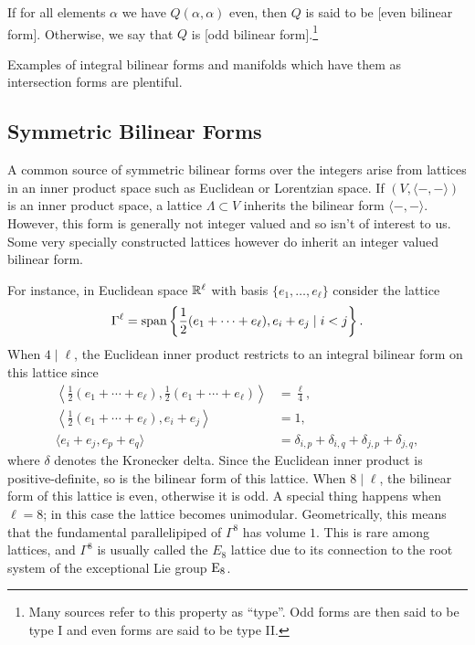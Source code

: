 \begin{definition}[Parity]
	If for all elements $\alpha$ we have $Q(\alpha,\alpha)$ even, then $Q$ is said to be [even bilinear form]. Otherwise, we say that $Q$ is [odd bilinear form].\footnote{Many sources refer to this property as ``type''. Odd forms are then said to be type I and even forms are said to be type II.}
\end{definition}

Examples of integral bilinear forms and manifolds which have them as intersection forms are plentiful. 



\subsection{Symmetric Bilinear Forms}

A common source of symmetric bilinear forms over the integers arise from lattices in an inner product space such as Euclidean or Lorentzian space. If $(V,\langle -,-\rangle)$ is an inner product space, a lattice $\Lambda\subset V$ inherits the bilinear form $\langle -,-\rangle$. However, this form is generally not integer valued and so isn't of interest to us. Some very specially constructed lattices however do inherit an integer valued bilinear form.

For instance, in Euclidean space $\mathbb{R}^\ell$ with basis $\{e_1,\ldots, e_\ell\}$ consider the lattice
\[
	\Gamma^\ell = {\operatorname{span}}\left\{\frac{1}{2}(e_1+\cdots + e_\ell), e_i+e_j \mid i<j\right\}.
\]
When $4\mid \ell$, the Euclidean inner product restricts to an integral bilinear form on this lattice since
\[
	\begin{aligned}
		\left\langle \frac{1}{2}(e_1+\cdots+e_\ell), \frac{1}{2}(e_1+\cdots+e_\ell)\right\rangle &= \frac{\ell}{4},\\
		\left\langle \frac{1}{2}(e_1+\cdots+e_\ell), e_i+e_j\right\rangle &= 1,\\
		\langle e_i+e_j, e_p +e_q\rangle &= \delta_{i,p}+\delta_{i,q}+\delta_{j,p}+\delta_{j,q},
	\end{aligned}
\]
where $\delta$ denotes the Kronecker delta. Since the Euclidean inner product is positive-definite, so is the bilinear form of this lattice. When $8\mid\ell$, the bilinear form of this lattice is even, otherwise it is odd. A special thing happens when $\ell=8$; in this case the lattice becomes unimodular. Geometrically, this means that the fundamental parallelipiped of $\Gamma^8$ has volume $1$. This is rare among lattices, and $\Gamma^8$ is usually called the ${E_8}$ lattice due to its connection to the root system of the exceptional Lie group ${\operatorname{E}}_8$.

